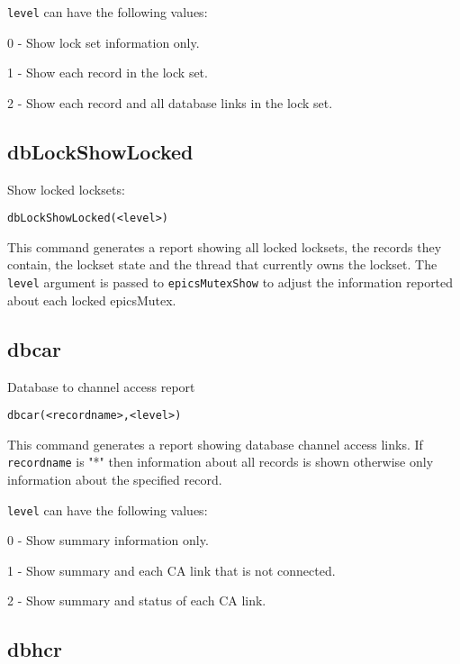 \verb|level| can have the following values:

\begin{description}\item 0 - Show lock set information only.

\item 1 - Show each record in the lock set.

\item 2 - Show each record and all database links in the lock set.

\end{description}\subsection{dbLockShowLocked}

Show locked locksets:

\begin{verbatim}dbLockShowLocked(<level>)
\end{verbatim}This command generates a report showing all locked locksets, the records they contain, the lockset state and the thread 
that currently owns the lockset. The \verb|level| argument is passed to \verb|epicsMutexShow| to adjust the information reported 
about each locked epicsMutex.

\subsection{dbcar}

Database to channel access report

\begin{verbatim}dbcar(<recordname>,<level>)
\end{verbatim}This command generates a report showing database channel access links. If \verb|recordname| is "*" then information about 
all records is shown otherwise only information about the specified record.

\verb|level| can have the following values:

\begin{description}\item 0 - Show summary information only.

\item 1 - Show summary and each CA link that is not connected.

\item 2 - Show summary and status of each CA link.

\end{description}\subsection{dbhcr}

